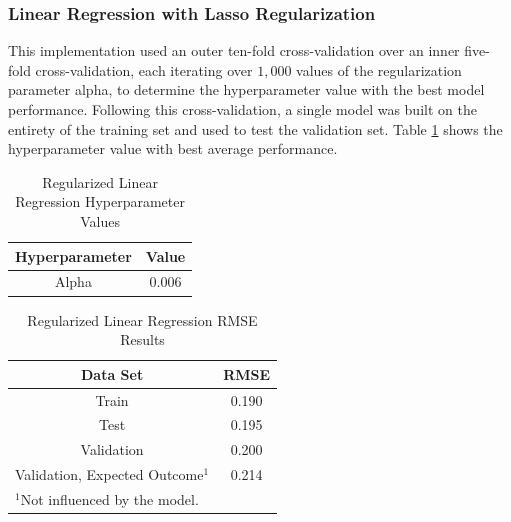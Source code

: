 \documentclass[conference]{IEEEtran}
\begin{document}
\subsubsection{Linear Regression with Lasso Regularization}
This implementation used an outer ten-fold cross-validation over an inner five-fold cross-validation, each iterating over $1,000$ values of the regularization parameter alpha, to determine the hyperparameter value with the best model performance. Following this cross-validation, a single model was built on the entirety of the training set and used to test the validation set. Table \ref{tab2} shows the hyperparameter value with best average performance. 

\begin{table}[htbp]
\caption{Regularized Linear Regression Hyperparameter Values}
\begin{center}
\begin{tabular}{|c||c|}
\hline
\textbf{Hyperparameter} & \textbf{Value} \\
\hline
\hline
Alpha & 0.006 \\
\hline
\end{tabular}
\label{tab2}
\end{center}
\end{table}

\begin{table}[htbp]
\caption{Regularized Linear Regression RMSE Results}
\begin{center}
\begin{tabular}{|c||c|}
\hline
\textbf{Data Set} & \textbf{RMSE} \\
\hline
\hline
Train & 0.190 \\
\hline
Test & 0.195 \\
\hline
Validation & 0.200 \\
\hline
Validation, Expected Outcome$^{\mathrm{1}}$ & 0.214 \\
\hline
\multicolumn{2}{l}{$^{\mathrm{1}}$Not influenced by the model.}
\end{tabular}
\label{tab3}
\end{center}
\end{table}
\end{document}
